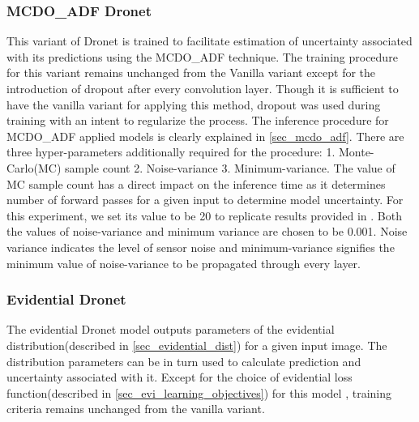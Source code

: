 \subsubsection{MCDO\_ADF Dronet}
This variant of Dronet is trained to facilitate estimation of uncertainty associated with its predictions using the MCDO\_ADF technique. The training procedure for this variant remains unchanged from the Vanilla variant except for the  introduction of dropout after every convolution layer. Though it is sufficient to have the vanilla variant for applying this method, dropout was used during training with an intent to regularize the process. The inference procedure for MCDO\_ADF applied models is clearly explained in \ref{sec_mcdo_adf}. There are three hyper-parameters additionally required for the procedure: 1. Monte-Carlo(MC) sample count 2. Noise-variance 3. Minimum-variance. The value of MC sample count has a direct impact on the inference time as it determines number of forward passes for a given input to determine model uncertainty. For this experiment, we set its value to be 20 to replicate results provided in \cite{loquercio2020a}. Both the values of noise-variance and minimum variance are chosen to be 0.001. Noise variance indicates the level of sensor noise and minimum-variance signifies the minimum value of noise-variance to be propagated through every layer.
\subsubsection{Evidential Dronet}
The evidential Dronet model outputs parameters of the evidential distribution(described in \ref{sec_evidential_dist}) for a given input image. The distribution parameters can be in turn used to calculate prediction and uncertainty associated with it. Except for the choice of evidential loss function(described in \ref{sec_evi_learning_objectives}) for this model , training criteria remains unchanged from the vanilla variant.
